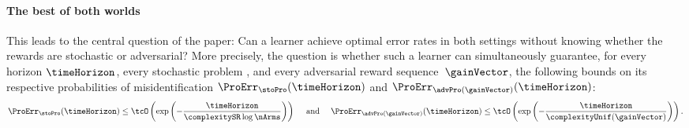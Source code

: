 \paragraph{The best of both worlds} This leads to the central question of the paper:
Can a learner achieve optimal error rates in both settings without knowing whether the rewards are stochastic or adversarial?
More precisely, the question is whether such a learner can simultaneously guarantee,
for every horizon $\timeHorizon$, every stochastic problem
\stoPro{}, and every adversarial reward sequence~$\gainVector$,
the following bounds on its respective probabilities of misidentification
$\ProErr_{\stoPro}(\timeHorizon) $ and
$\ProErr_{\advPro(\gainVector)}(\timeHorizon) $:
\[
\ProErr_{\stoPro}(\timeHorizon) 
\leq
\tcO\left(\exp\left(-\frac{\timeHorizon}{\complexitySR\log\nArms}\right)\right)
\text{ ~~~and~~~ }
\ProErr_{\advPro(\gainVector)}(\timeHorizon) 
\leq  
\tcO
\left(\exp\left(-\frac{\timeHorizon}{\complexityUnif(\gainVector)}\right)\right).
\]
%
